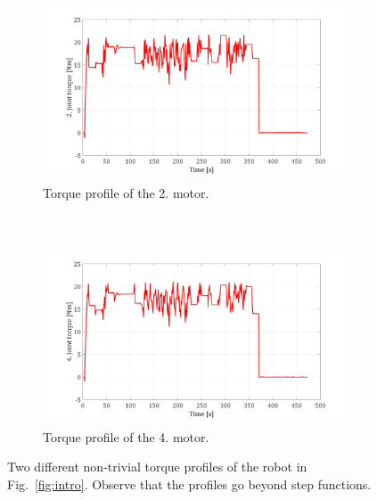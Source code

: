 \documentclass{ifacconf}
\begin{document}
\begin{figure}[t!]
	\centering
	\begin{subfigure}[b]{1.\columnwidth}
		\centering
		\includegraphics[height=2.1in]{./pictures/applications/T2.png}
		\caption{Torque profile of the 2. motor.}
	\end{subfigure}%
	~ 
	\begin{subfigure}[b]{1.\columnwidth}
		\centering
		\includegraphics[height=2.1in]{./pictures/applications/T4.png}
		\caption{Torque profile of the 4. motor.}
	\end{subfigure}
	\caption{Two different non-trivial  torque profiles of the robot in Fig.~\ref{fig:intro}. Observe that the profiles go beyond step functions. }
\end{figure}
\end{document}

